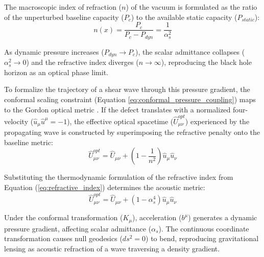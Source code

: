 The macroscopic index of refraction ($n$) of the vacuum is formulated as the ratio of the unperturbed baseline capacity ($P_c$) to the available static capacity ($P_{static}$):
\begin{equation}
    n(x) = \frac{P_c}{P_c - P_{dyn}} = \frac{1}{\alpha_s^2} \label{eq:refractive_index}
\end{equation}

As dynamic pressure increases ($P_{dyn} \to P_c$), the scalar admittance collapses ($\alpha_s^2 \to 0$) and the refractive index diverges ($n \to \infty$), reproducing the black hole horizon as an optical phase limit. 

To formalize the trajectory of a shear wave through this pressure gradient, the conformal scaling constraint (Equation \ref{eq:conformal_pressure_coupling}) maps to the Gordon optical metric \cite{Gordon1923}. If the defect translates with a normalized four-velocity ($\hat{u}_\mu \hat{u}^\mu = -1$), the effective optical spacetime ($\hat{U}^{opt}_{\mu\nu}$) experienced by the propagating wave is constructed by superimposing the refractive penalty onto the baseline metric:
\begin{equation}
    \hat{U}^{opt}_{\mu\nu} = \hat{U}_{\mu\nu} + \left( 1 - \frac{1}{n^2} \right) \hat{u}_\mu \hat{u}_\nu \label{eq:gordon_metric}
\end{equation}

Substituting the thermodynamic formulation of the refractive index from Equation (\ref{eq:refractive_index}) determines the acoustic metric:
\begin{equation}
    \hat{U}^{opt}_{\mu\nu} = \hat{U}_{\mu\nu} + \left( 1 - \alpha_s^4 \right) \hat{u}_\mu \hat{u}_\nu
\end{equation}

Under the conformal transformation ($K_\mu$), acceleration ($b^\mu$) generates a dynamic pressure gradient, affecting scalar admittance ($\alpha_s$). The continuous coordinate transformation causes null geodesics ($ds^2 = 0$) to bend, reproducing gravitational lensing as acoustic refraction of a wave traversing a density gradient.

